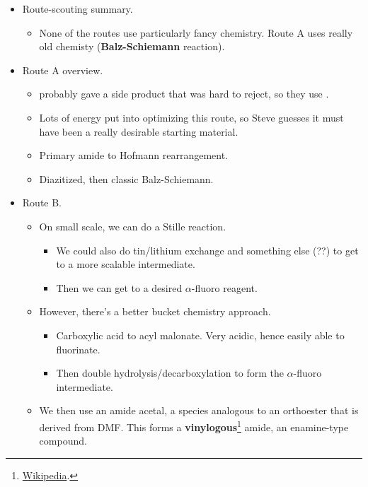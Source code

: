 \documentclass[../notes.tex]{subfiles}
\begin{document}
\begin{itemize}
\begin{itemize}
\begin{itemize}
        \end{itemize}
        \item Route-scouting summary.
        \begin{itemize}
            \item None of the routes use particularly fancy chemistry. Route A uses really old chemisty (\textbf{Balz-Schiemann} reaction).
        \end{itemize}
        \item Route A overview.
        \begin{itemize}
            \item {} probably gave a side product that was hard to reject, so they use .
            \item Lots of energy put into optimizing this route, so Steve guesses it must have been a really desirable starting material.
            \item Primary amide to Hofmann rearrangement.
            \item Diazitized, then classic Balz-Schiemann.
        \end{itemize}
        \item Route B.
        \begin{itemize}
            \item On small scale, we can do a Stille reaction.
            \begin{itemize}
                \item We could also do tin/lithium exchange and something else (??) to get to a more scalable intermediate.
                \item Then we can get to a desired $\alpha$-fluoro reagent.
            \end{itemize}
            \item However, there's a better bucket chemistry approach.
            \begin{itemize}
                \item Carboxylic acid to acyl malonate. Very acidic, hence easily able to fluorinate.
                \item Then double hydrolysis/decarboxylation to form the $\alpha$-fluoro intermediate.
            \end{itemize}
            \item We then use an amide acetal, a species analogous to an orthoester that is derived from DMF. This forms a \textbf{vinylogous}\footnote{\href{https://en.wikipedia.org/wiki/Vinylogy}{Wikipedia}.} amide, an enamine-type compound.

\end{itemize}
\end{itemize}
\end{itemize}
\end{document}
